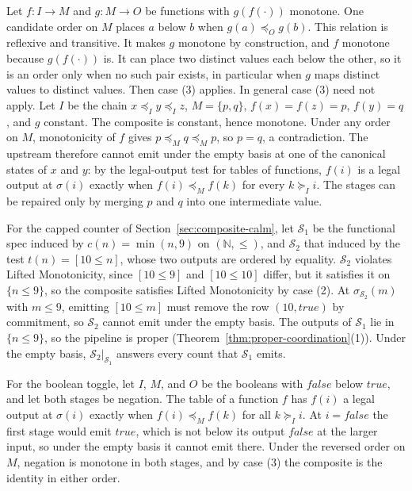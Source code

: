 \documentclass[sigconf]{cidr-2027}
\theoremstyle{remark}
\newcommand{\InputOrd}{\preceq_I}
\newcommand{\OutputOrd}{\preceq_O}
\newcommand{\InputGe}{\succeq_I}
\newcommand{\commitment}{commitment\xspace}
\begin{document}
\color{blue!70!black}Let $f:I\to M$ and $g:M\to O$ be
functions with $g(f(\cdot))$ monotone.  One candidate order on $M$
places $a$ below $b$ when $g(a)\OutputOrd g(b)$.  This relation is reflexive
and transitive.  It makes $g$ monotone by construction, and $f$ monotone
because $g(f(\cdot))$ is.  It can place two distinct values each below the
other, so it is an order only when no such pair exists, in particular when $g$
maps distinct values to distinct values.  Then case (3) applies.
In general case (3) need not apply.  Let $I$ be the chain $x\InputOrd
y\InputOrd z$, $M=\{p,q\}$, $f(x)=f(z)=p$, $f(y)=q$, and $g$ constant.  The
composite is constant, hence monotone.  Under any order on $M$, monotonicity
of $f$ gives $p\preceq_M q\preceq_M p$, so $p=q$, a contradiction.  The
upstream therefore cannot emit under the empty basis at one of the canonical
states of $x$ and $y$: by the legal-output test for tables of functions,
$f(i)$ is a legal output at $\sigma(i)$ exactly when $f(i)\preceq_M f(k)$ for
every $k\InputGe i$.  The stages can be repaired only by merging $p$ and $q$
into one intermediate value.\color{black}

\color{blue!70!black}For the capped counter of Section~\ref{sec:composite-calm}, let $\mathcal S_1$
be the functional spec induced by $c(n)=\min(n,9)$ on
$(\mathbb N,\le)$, and $\mathcal S_2$ that induced by the test $t(n)=[10\le n]$,
whose two outputs are ordered by equality.  $\mathcal S_2$
violates Lifted Monotonicity, since $[10\le 9]$ and $[10\le 10]$ differ, but it
satisfies it on $\{n\le 9\}$, so the composite satisfies Lifted Monotonicity by case (2).  At
$\sigma_{\mathcal S_2}(m)$ with $m\le 9$, emitting $[10\le m]$ must remove the row
$(10,\mathit{true})$ by \commitment, so $\mathcal S_2$ cannot emit under the empty basis.
The outputs of $\mathcal S_1$ lie in $\{n\le 9\}$, so the pipeline is proper
(Theorem~\ref{thm:proper-coordination}(1)).  Under the empty basis,
$\mathcal S_2|_{\mathcal S_1}$ answers every count that $\mathcal S_1$ emits.\color{black}

For the boolean toggle, let $I$, $M$, and $O$ be the booleans with
$\mathit{false}$ below $\mathit{true}$, and let both stages be negation.  The
table of a function $f$ has $f(i)$ a legal output at $\sigma(i)$ exactly when
$f(i)\preceq_M f(k)$ for all $k\InputGe i$.  At $i=\mathit{false}$ the first
stage would emit $\mathit{true}$, which is not below its output
$\mathit{false}$ at the larger input, so under the empty basis it cannot emit
there.  Under the reversed order on $M$, negation is monotone in both stages,
and by case (3) the composite is the identity in either order.
\end{document}
